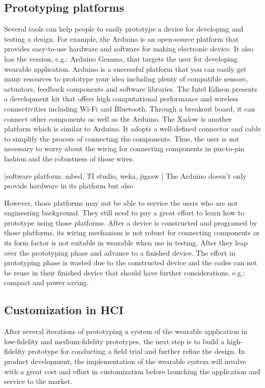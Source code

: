 \subsection{Prototyping platforms}
Several tools can help people to easily prototype a device for developing and testing a design. For example, the Arduino \cite{Arduino} is an open-source platform that provides easy-to-use hardware and software for making electronic device. It also has the version, e.g.: Arduino Gemma, that targets the user for developing wearable application. Arduino is a successful platform that you can easily get many resources to prototype your idea including plenty of compatible sensors, actuators, feedback components and software libraries.
The Intel Edison \cite{IntelEdison} presents a development kit that offers high computational performance and wireless connectivities including Wi-Fi and Bluetooth. Through a breakout board, it can connect other components as well as the Arduino.
The Xadow \cite{xadow} is another platform which is similar to Arduino. It adopts a well-defined connector and cable to simplify the process of connecting the components. Thus, the user is not necessary to worry about the wiring for connecting components in pin-to-pin fashion and the robustness of those wires.

[software platform: mbed, TI studio, weka, jigsaw ]
The Arduino doesn't only provide hardware in its platform but also 


However, those platforms may not be able to service the users who are not engineering background. They still need to pay a great effort to learn how to prototype using those platforms. After a device is constructed and programed by those platforms, its wiring mechanism is not robust for connecting components or its form factor is not suitable in wearable when use in testing. After they leap over the prototyping phase and advance to a finished device. The effort in prototyping phase is wasted due to the constructed device and the codes can not be reuse in their finished device that should have further considerations, e.g.: compact and power saving.

\subsection{Customization in HCI}
After several iterations of prototyping a system of the wearable application in low-fidelity and medium-fidelity prototypes, the next step is to build a high-fidelity prototype for conducting a field trial and further refine the design.
In product development, the implementation of the wearable system will involve with a great cost and effort in customization before launching the application and service to the market.

